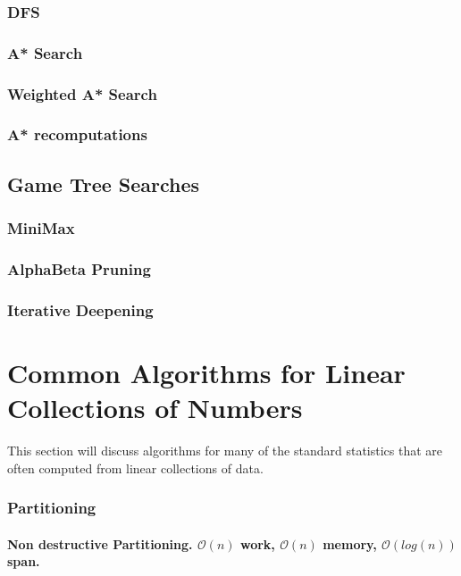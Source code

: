 \documentclass[12pt, letterpaper]{book}
\newcommand{\bigO}{\mathcal{O}}
\begin{document}
		\subsection{DFS}
		\subsection{A* Search}
		\subsection{Weighted A* Search}
		\subsection{A* recomputations}

	\section{Game Tree Searches} \label{game trees}
		\subsection{MiniMax} \label{minimax}
		\subsection{AlphaBeta Pruning}
		\subsection{Iterative Deepening}

	\chapter{Common Algorithms for Linear Collections of Numbers}

		This section will discuss algorithms for many of the standard statistics that are often computed from linear collections of data.

		\subsection{Partitioning} \label{Partitioning Algorithms}

		\subsubsection{Non destructive Partitioning. $\bigO(n)$ work, $\bigO(n)$ memory, $\bigO(log(n))$ span.}
\end{document}
